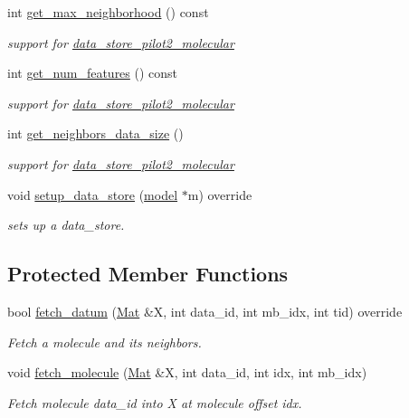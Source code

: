 \begin{DoxyCompactItemize}
int \hyperlink{classlbann_1_1pilot2__molecular__reader_a1dcc424e004681f9287453df64bb751f}{get\+\_\+max\+\_\+neighborhood} () const
\begin{DoxyCompactList}\small\item\em support for \hyperlink{classlbann_1_1data__store__pilot2__molecular}{data\+\_\+store\+\_\+pilot2\+\_\+molecular} \end{DoxyCompactList}\item 
int \hyperlink{classlbann_1_1pilot2__molecular__reader_ad4fcb0da3f6964cbe24de4feac3f5f4a}{get\+\_\+num\+\_\+features} () const
\begin{DoxyCompactList}\small\item\em support for \hyperlink{classlbann_1_1data__store__pilot2__molecular}{data\+\_\+store\+\_\+pilot2\+\_\+molecular} \end{DoxyCompactList}\item 
int \hyperlink{classlbann_1_1pilot2__molecular__reader_a628d96b642e913550316076a11ba5285}{get\+\_\+neighbors\+\_\+data\+\_\+size} ()
\begin{DoxyCompactList}\small\item\em support for \hyperlink{classlbann_1_1data__store__pilot2__molecular}{data\+\_\+store\+\_\+pilot2\+\_\+molecular} \end{DoxyCompactList}\item 
void \hyperlink{classlbann_1_1pilot2__molecular__reader_a0c18335afe5625a7aa8b8275392c0317}{setup\+\_\+data\+\_\+store} (\hyperlink{classlbann_1_1model}{model} $\ast$m) override
\begin{DoxyCompactList}\small\item\em sets up a data\+\_\+store. \end{DoxyCompactList}\end{DoxyCompactItemize}
\subsection*{Protected Member Functions}
\begin{DoxyCompactItemize}
\item 
bool \hyperlink{classlbann_1_1pilot2__molecular__reader_a9ad317abcd6f5de777d536f7796a3b12}{fetch\+\_\+datum} (\hyperlink{base_8hpp_a68f11fdc31b62516cb310831bbe54d73}{Mat} \&X, int data\+\_\+id, int mb\+\_\+idx, int tid) override
\begin{DoxyCompactList}\small\item\em Fetch a molecule and its neighbors. \end{DoxyCompactList}\item 
void \hyperlink{classlbann_1_1pilot2__molecular__reader_ae45c583f72e11aeb5d955e2657a9a3e8}{fetch\+\_\+molecule} (\hyperlink{base_8hpp_a68f11fdc31b62516cb310831bbe54d73}{Mat} \&X, int data\+\_\+id, int idx, int mb\+\_\+idx)
\begin{DoxyCompactList}\small\item\em Fetch molecule data\+\_\+id into X at molecule offset idx. \end{DoxyCompactList}\end{DoxyCompactItemize}
